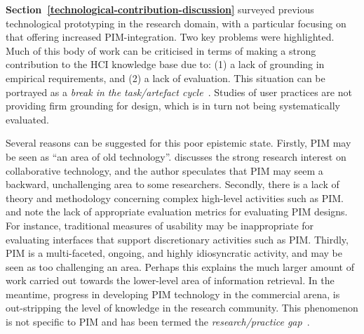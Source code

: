 \textbf{Section~\ref{technological-contribution-discussion}} surveyed previous technological prototyping in the research domain, with a particular focusing on that offering increased PIM-integration.  Two key problems were highlighted.  Much of this body of work can be criticised in terms of making a strong contribution to the HCI knowledge base due to: (1) a lack of grounding in empirical requirements, and (2) a lack of evaluation. This situation can be portrayed as a \textit{break in the task/artefact cycle}~\citep{Carroll-cycle:91}. Studies of user practices are not providing firm grounding for design, which is in turn not being systematically evaluated.


Several reasons can be suggested for this poor epistemic state. Firstly, PIM may be seen as ``an area of old technology''.  \citet{Carroll-review:97} discusses the strong research interest on collaborative technology, and the author speculates that PIM may seem a backward, unchallenging area to some researchers.  Secondly, there is a lack of theory and methodology concerning complex high-level activities such as PIM.  \citet{ad:01} and \citet{Whittaker-rta:00} note the lack of appropriate evaluation metrics for evaluating PIM designs. For instance, traditional measures of usability may be inappropriate for evaluating interfaces that support discretionary activities such as PIM.  Thirdly, PIM is a multi-faceted, ongoing, and highly idiosyncratic activity, and may be seen as too challenging an area.  Perhaps this explains the much larger amount of work carried out towards the lower-level area of information retrieval.   In the meantime, progress in developing PIM technology in the commercial arena, is out-stripping the level of knowledge in the research community.  This phenomenon is not specific to PIM and has been termed the \textit{research/practice gap}~\citep{Carroll:00,rogers:04}.  %

